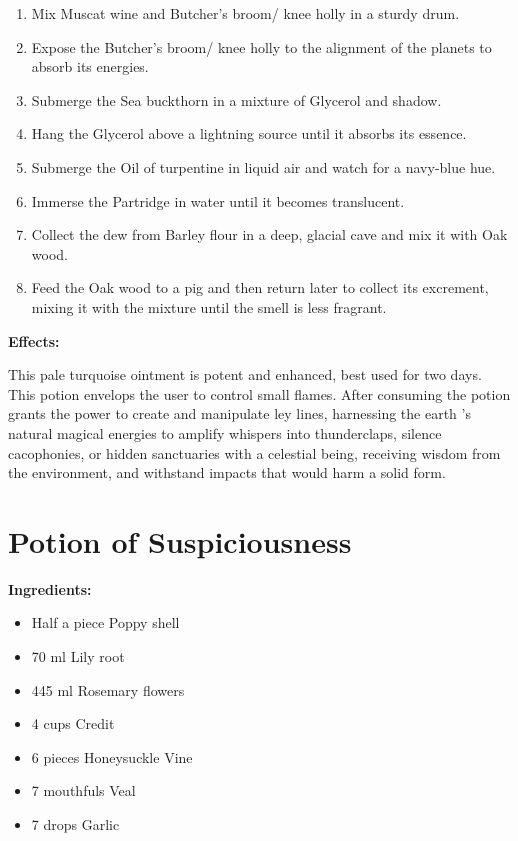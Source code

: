 \documentclass{article}
\begin{document}
\begin{enumerate}
  \item Mix Muscat wine and Butcher's broom/ knee holly in a sturdy drum.
  \item Expose the Butcher's broom/ knee holly to the alignment of the planets to absorb its energies.
  \item Submerge the Sea buckthorn in a mixture of Glycerol and shadow.
  \item Hang the Glycerol above a lightning source until it absorbs its essence.
  \item Submerge the Oil of turpentine in liquid air and watch for a navy-blue hue.
  \item Immerse the Partridge in water until it becomes translucent.
  \item Collect the dew from Barley flour in a deep, glacial cave and mix it with Oak wood.
  \item Feed the Oak wood to a pig and then return later to collect its excrement, mixing it with the mixture until the smell is less fragrant.
\end{enumerate}

\textbf{Effects:}

This pale turquoise ointment is potent and enhanced, best used for two days. This potion envelops the user to control small flames. After consuming the potion grants the power to create and manipulate ley lines, harnessing the earth 's natural magical energies to amplify whispers into thunderclaps, silence cacophonies, or hidden sanctuaries with a celestial being, receiving wisdom from the environment, and withstand impacts that would harm a solid form.

\newpage
\section*{Potion of Suspiciousness}

\textbf{Ingredients:}

\begin{itemize}
  \item Half a piece Poppy shell
  \item 70 ml Lily root
  \item 445 ml Rosemary flowers
  \item 4 cups Credit
  \item 6 pieces Honeysuckle Vine
  \item 7 mouthfuls Veal
  \item 7 drops Garlic
\end{itemize}
\end{document}
